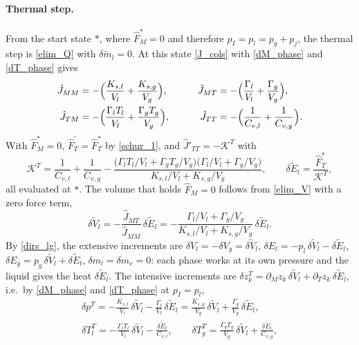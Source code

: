 \paragraph{Thermal step.}
From the start state $*$, where $\hat{F}_M^*=0$ and therefore $p_I=p_l=p_g+p_{j}$, the thermal step is \eqref{elim_Q} with $\delta\tilde{m}_l=0$. At this state \eqref{J_cols} with \eqref{dM_phase} and \eqref{dT_phase} gives
\begin{equation}\label{J_MT_block}
\begin{aligned}
\hat{J}_{MM}&=-\Bigl(\frac{K_{s,l}}{V_l}+\frac{K_{s,g}}{V_g}\Bigr),&\qquad \hat{J}_{MT}&=-\Bigl(\frac{\Gamma_l}{V_l}+\frac{\Gamma_g}{V_g}\Bigr),\\
\hat{J}_{TM}&=-\Bigl(\frac{\Gamma_lT_l}{V_l}+\frac{\Gamma_gT_g}{V_g}\Bigr),&\qquad \hat{J}_{TT}&=-\Bigl(\frac1{C_{v,l}}+\frac1{C_{v,g}}\Bigr).
\end{aligned}
\end{equation}
With $\hat{F}_M^*=0$, $\hat{F}^{\prime}_T=\hat{F}_T^*$ by \eqref{schur_1}, and $\hat{J}'_{TT}=-\mathcal{K}^T$ with
\begin{equation}\label{K_T}
\mathcal{K}^T=\frac1{C_{v,l}}+\frac1{C_{v,g}}-\frac{\bigl(\Gamma_lT_l/V_l+\Gamma_gT_g/V_g\bigr)\bigl(\Gamma_l/V_l+\Gamma_g/V_g\bigr)}{K_{s,l}/V_l+K_{s,g}/V_g},\qquad \delta\tilde{E}_l=\frac{\hat{F}_T^*}{\mathcal{K}^T},
\end{equation}
all evaluated at $*$. The volume that holds $\hat{F}_M=0$ follows from \eqref{elim_V} with a zero force term,
\begin{equation}
\delta\tilde{V}_l=-\frac{\hat{J}_{MT}}{\hat{J}_{MM}}\,\delta\tilde{E}_l=-\frac{\Gamma_l/V_l+\Gamma_g/V_g}{K_{s,l}/V_l+K_{s,g}/V_g}\,\delta\tilde{E}_l .
\end{equation}
By \eqref{dirs_lg}, the extensive increments are $\delta V_l=-\delta V_g=\delta\tilde{V}_l$, $\delta E_l=-p_l\,\delta\tilde{V}_l-\delta\tilde{E}_l$, $\delta E_g=p_g\,\delta\tilde{V}_l+\delta\tilde{E}_l$, $\delta m_l=\delta m_v=0$: each phase works at its own pressure and the liquid gives the heat $\delta\tilde{E}_l$. The intensive increments are $\delta z_k^T=\partial_Mz_k\,\delta\tilde{V}_l+\partial_Tz_k\,\delta\tilde{E}_l$, i.e.\ by \eqref{dM_phase} and \eqref{dT_phase} at $p_I=p_l$,
\begin{equation}\label{incr_T}
\begin{gathered}
\delta p^T=-\frac{K_{s,l}}{V_l}\,\delta\tilde{V}_l-\frac{\Gamma_l}{V_l}\,\delta\tilde{E}_l=\frac{K_{s,g}}{V_g}\,\delta\tilde{V}_l+\frac{\Gamma_g}{V_g}\,\delta\tilde{E}_l,\\
\delta T_l^T=-\frac{\Gamma_lT_l}{V_l}\,\delta\tilde{V}_l-\frac{\delta\tilde{E}_l}{C_{v,l}},\qquad \delta T_g^T=\frac{\Gamma_gT_g}{V_g}\,\delta\tilde{V}_l+\frac{\delta\tilde{E}_l}{C_{v,g}},
\end{gathered}
\end{equation}
